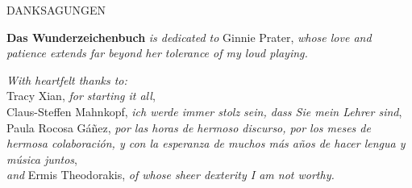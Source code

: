 \documentclass[11pt]{article}
\begin{document}
\begingroup
\begin{center}
\huge DANKSAGUNGEN
\end{center}
\endgroup

\vspace*{13\baselineskip}

\begingroup
\begin{center}
\textbf{Das Wunderzeichenbuch} \textit{is dedicated to} Ginnie Prater, \textit{whose love and patience extends far beyond her tolerance of my loud playing.}
\end{center}
\endgroup

\begingroup
\begin{center}
\textit{With heartfelt thanks to:} \\
Tracy Xian, \textit{for starting it all}, \\
Claus-Steffen Mahnkopf, \textit{ich werde immer stolz sein, dass Sie mein Lehrer sind}, \\
Paula Rocosa Gáñez, \textit{por las horas de hermoso discurso, por los meses de hermosa colaboración, y con la esperanza de muchos más años de hacer lengua y música juntos}, \\
\textit{and} Ermis Theodorakis, \textit{of whose sheer dexterity I am not worthy.}
\end{center}
\endgroup
\end{document}
